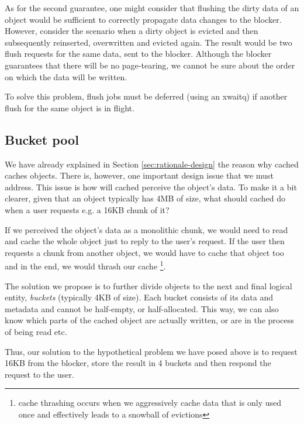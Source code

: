 As for the second guarantee, one might consider that flushing the dirty data of 
an object would be sufficient to correctly propagate data changes to the 
blocker.  However, consider the scenario when a dirty object is evicted and 
then subsequently reinserted, overwritten and evicted again. The result would 
be two flush requests for the same data, sent to the blocker. Although the 
blocker guarantees that there will be no page-tearing, we cannot be sure about 
the order on which the data will be written.

To solve this problem, flush jobs must be deferred (using an xwaitq) if another 
flush for the same object is in flight. 

\subsection{Bucket pool}


We have already explained in Section \ref{sec:rationale-design} the reason why 
cached caches objects. There is, however, one important design issue that we 
must address. This issue is how will cached perceive the object's data. To make 
it a bit clearer, given that an object typically has 4MB of size, what should 
cached do when a user requests e.g. a 16KB chunk of it?

If we perceived the object's data as a monolithic chunk, we would need to read 
and cache the whole object just to reply to the user's request. If the user 
then requests a chunk from another object, we would have to cache that object 
too and in the end, we would thrash our cache
\footnote{
	cache thrashing occurs when we aggressively cache data that is only 
	used once and effectively leads to a snowball of evictions
}.

The solution we propose is to further divide objects to the next and final 
logical entity, \emph{buckets} (typically 4KB of size). Each bucket consists of 
its data and metadata and cannot be half-empty, or half-allocated. This way, we 
can also know which parts of the cached object are actually written, or are in 
the process of being read etc.

Thus, our solution to the hypothetical problem we have posed above is to 
request 16KB from the blocker, store the result in 4 buckets and then respond 
the request to the user.

